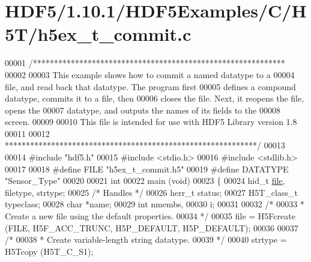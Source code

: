 \hypertarget{_h_d_f5_21_810_81_2_h_d_f5_examples_2_c_2_h5_t_2h5ex__t__commit_8c_source}{}\section{H\+D\+F5/1.10.1/\+H\+D\+F5\+Examples/\+C/\+H5\+T/h5ex\+\_\+t\+\_\+commit.c}
\label{_h_d_f5_21_810_81_2_h_d_f5_examples_2_c_2_h5_t_2h5ex__t__commit_8c_source}

\begin{DoxyCode}
00001 \textcolor{comment}{/************************************************************}
00002 \textcolor{comment}{}
00003 \textcolor{comment}{  This example shows how to commit a named datatype to a}
00004 \textcolor{comment}{  file, and read back that datatype.  The program first}
00005 \textcolor{comment}{  defines a compound datatype, commits it to a file, then}
00006 \textcolor{comment}{  closes the file.  Next, it reopens the file, opens the}
00007 \textcolor{comment}{  datatype, and outputs the names of its fields to the}
00008 \textcolor{comment}{  screen.}
00009 \textcolor{comment}{}
00010 \textcolor{comment}{  This file is intended for use with HDF5 Library version 1.8}
00011 \textcolor{comment}{}
00012 \textcolor{comment}{ ************************************************************/}
00013 
00014 \textcolor{preprocessor}{#include "hdf5.h"}
00015 \textcolor{preprocessor}{#include <stdio.h>}
00016 \textcolor{preprocessor}{#include <stdlib.h>}
00017 
00018 \textcolor{preprocessor}{#define FILE            "h5ex\_t\_commit.h5"}
00019 \textcolor{preprocessor}{#define DATATYPE        "Sensor\_Type"}
00020 
00021 \textcolor{keywordtype}{int}
00022 main (\textcolor{keywordtype}{void})
00023 \{
00024     hid\_t           \hyperlink{structfile}{file}, filetype, strtype;
00025                                             \textcolor{comment}{/* Handles */}
00026     herr\_t          status;
00027     H5T\_class\_t     typeclass;
00028     \textcolor{keywordtype}{char}            *name;
00029     \textcolor{keywordtype}{int}             nmembs,
00030                     i;
00031 
00032     \textcolor{comment}{/*}
00033 \textcolor{comment}{     * Create a new file using the default properties.}
00034 \textcolor{comment}{     */}
00035     file = H5Fcreate (FILE, H5F\_ACC\_TRUNC, H5P\_DEFAULT, H5P\_DEFAULT);
00036 
00037     \textcolor{comment}{/*}
00038 \textcolor{comment}{     * Create variable-length string datatype.}
00039 \textcolor{comment}{     */}
00040     strtype = H5Tcopy (H5T\_C\_S1);

\end{DoxyCode}
